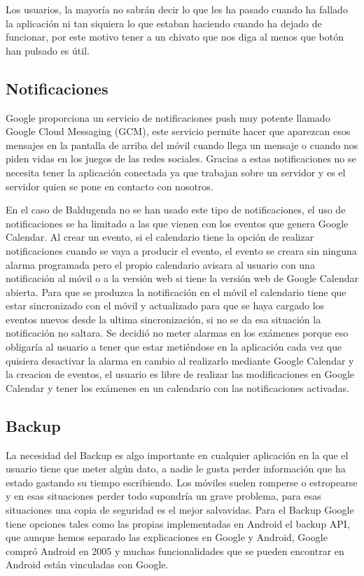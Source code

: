 Los usuarios, la mayoría no sabrán decir lo que les ha pasado cuando ha fallado la aplicación ni tan siquiera lo que estaban haciendo cuando ha dejado de funcionar, por este motivo tener a un chivato que nos diga al menos que botón han pulsado es útil.
 


\subsection{Notificaciones}
\label{subsecc:Notificaciones}

Google proporciona un servicio de notificaciones push muy potente llamado Google Cloud Messaging (GCM), este servicio permite hacer que aparezcan esos mensajes en la pantalla de arriba del móvil cuando llega un mensaje o cuando nos piden vidas en los juegos de las redes sociales.
Gracias a estas notificaciones no se necesita tener la aplicación conectada ya que trabajan sobre un servidor y es el servidor quien se pone en contacto con nosotros.

En el caso de Baldugenda no se han usado este tipo de notificaciones, el uso de notificaciones se ha limitado a las que vienen con los eventos que genera Google Calendar.
Al crear un evento, si el calendario tiene la opción de realizar notificaciones cuando se vaya a producir el evento,   el evento se creara sin ninguna alarma programada pero el propio calendario avisara al usuario con una notificación al móvil o a la versión web si tiene la versión web de Google Calendar abierta.
Para que se produzca la notificación en el móvil el calendario tiene que estar sincronizado con el móvil y actualizado para que se haya cargado los eventos nuevos desde la ultima sincronización, si no se da esa situación la notificación no saltara.
Se decidió no meter alarmas en los exámenes porque eso obligaría al usuario a tener que estar metiéndose en la aplicación cada vez que quisiera desactivar la alarma en cambio al realizarlo mediante Google Calendar y la creacion de eventos, el usuario es libre de realizar las modificaciones en Google Calendar y tener los exámenes en un calendario con las notificaciones activadas.

\subsection{Backup}
\label{subsecc:Backup}

La necesidad del Backup es algo importante en cualquier aplicación en la que el usuario tiene que meter algún dato, a nadie le gusta perder información que ha estado gastando su tiempo escribiendo. Los móviles suelen romperse o estropearse y en esas situaciones perder todo supondría un grave problema, para esas situaciones una copia de seguridad es el mejor salvavidas.
Para el Backup Google tiene opciones tales como las propias implementadas en Android el backup API, que aunque hemos separado las explicaciones en Google y Android, Google compró Android en 2005 y muchas funcionalidades que se pueden encontrar en Android están vinculadas con Google.

